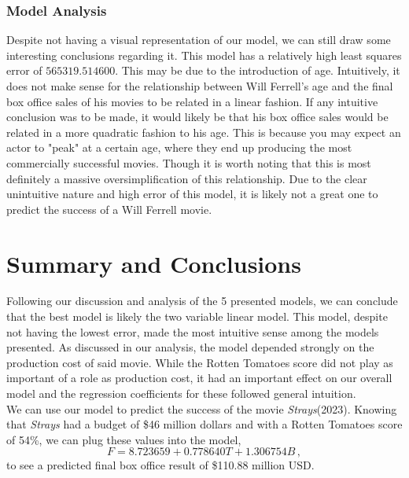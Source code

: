 \documentclass[11pt]{article}
\begin{document}
\subsubsection{Model Analysis} 
Despite not having a visual representation of our model, we can still draw some interesting conclusions regarding it.  
This model has a relatively high least squares error of $565319.514600$.  
This may be due to the introduction of age.  
Intuitively, it does not make sense for the relationship between Will Ferrell's age and the final box office sales of his movies to be related in a linear fashion.  
If any intuitive conclusion was to be made, it would likely be that his box office sales would be related in a more quadratic fashion to his age.  
This is because you may expect an actor to "peak" at a certain age, where they end up producing the most commercially successful movies.
Though it is worth noting that this is most definitely a massive oversimplification of this relationship.
Due to the clear unintuitive nature and high error of this model, it is likely not a great one to predict the success of a Will Ferrell movie.



\section{\centering Summary and Conclusions}
Following our discussion and analysis of the 5 presented models, we can conclude that the best model is likely the two variable linear model.  
This model, despite not having the lowest error, made the most intuitive sense among the models presented.
As discussed in our analysis, the model depended strongly on the production cost of said movie. 
While the Rotten Tomatoes score did not play as important of a role as production cost, it had an important effect on our overall model and the regression coefficients for these followed general intuition.
\\

We can use our model to predict the success of the movie \textit{Strays}(2023).  Knowing that \textit{Strays} had a budget of \$46 million dollars and with a Rotten Tomatoes score of 54\%, we can plug these values into the model,
\[ F = 8.723659 +  0.778640T + 1.306754 B \, ,\]
to see a predicted final box office result of \$110.88 million USD.
\end{document}
